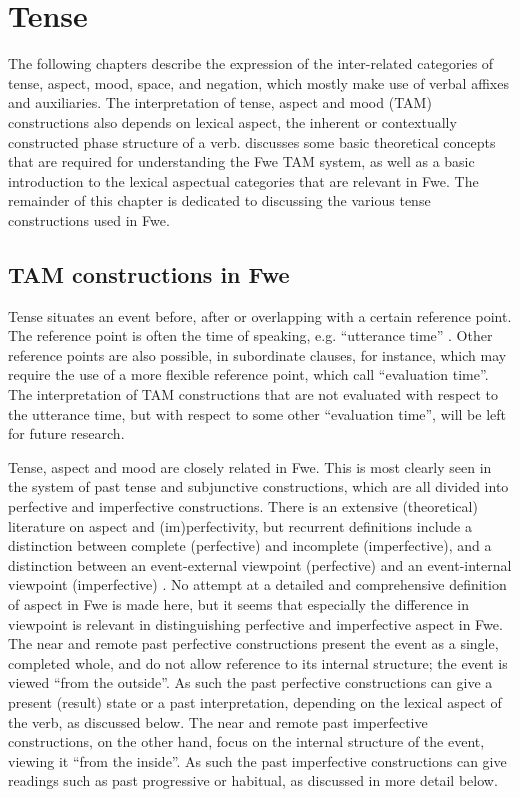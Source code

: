 \chapter{Tense}
\hypertarget{Toc75352677}{}
The following chapters describe the expression of the inter-related categories of tense, aspect, mood, space, and negation, which mostly make use of verbal affixes and auxiliaries. The interpretation of tense, aspect and mood (TAM) constructions also depends on lexical aspect, the inherent or contextually constructed phase structure of a verb.  discusses some basic theoretical concepts that are required for understanding the Fwe TAM system, as well as a basic introduction to the lexical aspectual categories that are relevant in Fwe. The remainder of this chapter is dedicated to discussing the various tense constructions used in Fwe.

\section{TAM constructions in Fwe}
\label{bkm:Ref74925053}\hypertarget{Toc75352678}{}
Tense situates an event before, after or overlapping with a certain reference point. The reference point is often the time of speaking, e.g. “utterance time” \citep{Klein1994}. Other reference points are also possible, in subordinate clauses, for instance, which may require the use of a more flexible reference point, which {\citet{CoverTonhauser2015}} call “evaluation time”. The interpretation of TAM constructions that are not evaluated with respect to the utterance time, but with respect to some other “evaluation time”, will be left for future research.

Tense, aspect and mood are closely related in Fwe. This is most clearly seen in the system of past tense and subjunctive constructions, which are all divided into perfective and imperfective constructions. There is an extensive (theoretical) literature on aspect and (im)perfectivity, but recurrent definitions include a distinction between complete (perfective) and incomplete (imperfective), and a distinction between an event-external viewpoint (perfective) and an event-internal viewpoint (imperfective) \citep[27]{Klein1994}. No attempt at a detailed and comprehensive definition of aspect in Fwe is made here, but it seems that especially the difference in viewpoint is relevant in distinguishing perfective and imperfective aspect in Fwe. The near and remote past perfective constructions present the event as a single, completed whole, and do not allow reference to its internal structure; the event is viewed “from the outside”. As such the past perfective constructions can give a present (result) state or a past interpretation, depending on the lexical aspect of the verb, as discussed below. The near and remote past imperfective constructions, on the other hand, focus on the internal structure of the event, viewing it “from the inside”. As such the past imperfective constructions can give readings such as past progressive or habitual, as discussed in more detail below.

